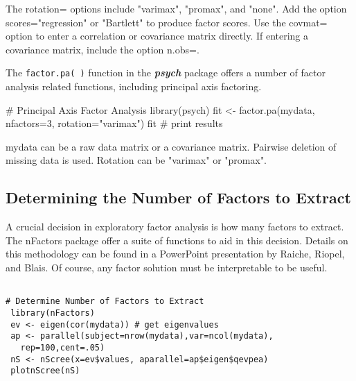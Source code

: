 The rotation= options include "varimax", "promax", and "none". Add the option scores="regression" or "Bartlett" to produce factor scores. Use the covmat= option to enter a correlation or covariance matrix directly. If entering a covariance matrix, include the option n.obs=.

The \texttt{factor.pa( )} function in the \textbf{\textit{psych}} package offers a number of factor analysis related functions, including principal axis factoring. 

# Principal Axis Factor Analysis
 library(psych)
 fit <- factor.pa(mydata, nfactors=3, rotation="varimax")
 fit # print results 

mydata can be a raw data matrix or a covariance matrix. Pairwise deletion of missing data is used. Rotation can be "varimax" or "promax". 

\subsection{Determining the Number of Factors to Extract}

A crucial decision in exploratory factor analysis is how many factors to extract. The nFactors package offer a suite of functions to aid in this decision. Details on this methodology can be found in a PowerPoint presentation by Raiche, Riopel, and Blais. Of course, any factor solution must be interpretable to be useful. 
\begin{verbatim}

# Determine Number of Factors to Extract
 library(nFactors)
 ev <- eigen(cor(mydata)) # get eigenvalues
 ap <- parallel(subject=nrow(mydata),var=ncol(mydata),
   rep=100,cent=.05)
 nS <- nScree(x=ev$values, aparallel=ap$eigen$qevpea)
 plotnScree(nS) 
\end{verbatim}